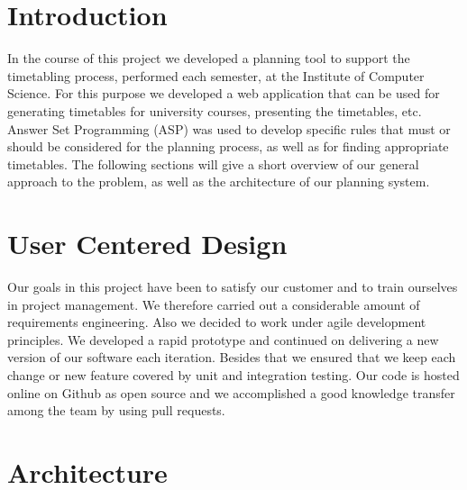 \documentclass[12pt]{article} %
\begin{document}

\tableofcontents %

\newpage %


\section{Introduction} 

In the course of this project we developed a planning tool to support the timetabling process, performed each semester, at the Institute of Computer Science.
For this purpose we developed a web application that can be used for generating timetables for university courses, presenting the timetables, etc.
Answer Set Programming (ASP) \cite{ASP} was used to develop specific rules that must or should be considered for the planning process, as well as for finding appropriate timetables.
The following sections will give a short overview of our general approach to the problem, as well as the architecture of our planning system.


\section{User Centered Design} 

Our goals in this project have been to satisfy our customer and to train ourselves in project management.
We therefore carried out a considerable amount of requirements engineering.
Also we decided to work under agile development principles.
We developed a rapid prototype and continued on delivering a new version of our software each iteration.
Besides that we ensured that we keep each change or new feature covered by unit and integration testing.
Our code is hosted online on Github as open source and we accomplished a good knowledge transfer among the team by using pull requests.

\section{Architecture} %
\end{document}

